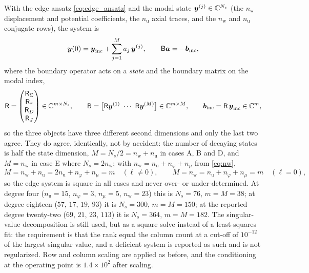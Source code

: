 With the edge ansatz \eqref{eq:edge_ansatz} and the modal state
$\boldsymbol{y}^{(j)}\in\mathbb{C}^{N_s}$ (the $n_{\mathrm w}$ displacement and
potential coefficients, the $n_{\mathrm u}$ axial traces, and the $n_{\mathrm w}$
and $n_{\mathrm u}$ conjugate rows), the system is
\begin{equation*}
\boldsymbol{y}(0)=\boldsymbol{y}_{\text{inc}}+\sum_{j=1}^{M}a_j\,\boldsymbol{y}^{(j)},
\qquad
\mathsf B\boldsymbol{a}=-\boldsymbol{b}_{\text{inc}},
\end{equation*}
where the boundary operator acts on a \emph{state} and the boundary matrix on the
modal index,
\begin{equation*}
\mathsf R=\begin{pmatrix}
\mathsf R_{\Sigma}\\
\mathsf R_{\tau}\\
\mathsf R_{D}\\
\mathsf R_{J}
\end{pmatrix}\in\mathbb{C}^{m\times N_s},
\qquad
\mathsf B=\bigl[\mathsf R\boldsymbol{y}^{(1)}\ \cdots\ \mathsf R\boldsymbol{y}^{(M)}\bigr]
\in\mathbb{C}^{m\times M},
\qquad
\boldsymbol{b}_{\text{inc}}=\mathsf R\,\boldsymbol{y}_{\text{inc}}\in\mathbb{C}^{m},
\end{equation*}
so the three objects have three different second dimensions and only the last two
agree.  They do agree, identically, not by accident: the number of
decaying states is half the state dimension, $M=N_s/2=n_{\mathrm w}+n_{\mathrm u}$
in cases A, B and D, and $M=n_{\mathrm w}$ in case E where $N_s=2n_{\mathrm w}$;
with $n_{\mathrm w}=n_{\mathrm u}+n_\varphi+n_\mu$ from \eqref{eq:nw},
\begin{equation}
\label{eq:app_edge_square}
M=n_{\mathrm w}+n_{\mathrm u}=2n_{\mathrm u}+n_\varphi+n_\mu=m
\quad(\ell\neq0),
\qquad
M=n_{\mathrm w}=n_{\mathrm u}+n_\varphi+n_\mu=m
\quad(\ell=0),
\end{equation}
so the edge system is square in all cases and never over- or under-determined.
At degree four ($n_{\mathrm u}=15$, $n_\varphi=3$, $n_\mu=5$, $n_{\mathrm w}=23$)
this is $N_s=76$, $m=M=38$; at degree eighteen ($57$, $17$, $19$, $93$) it is
$N_s=300$, $m=M=150$; at the reported degree twenty-two ($69$, $21$, $23$, $113$)
it is $N_s=364$, $m=M=182$.  The singular-value decomposition is still used, but as a square solve instead of a least-squares fit: the requirement is that the
rank equal the column count at a cut-off of $10^{-12}$ of the largest singular
value, and a deficient system is reported as such and is not regularized.  Row and
column scaling are applied as before, and the conditioning at the operating point
is $1.4\times10^{2}$ after scaling.
